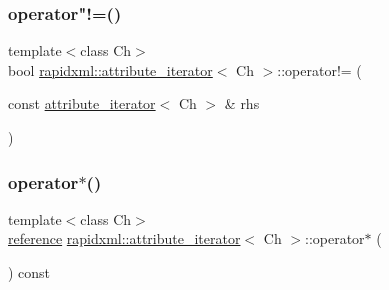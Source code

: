 \subsubsection{\texorpdfstring{operator"!=()}{operator!=()}\hspace{0.1cm}{\footnotesize\ttfamily [2/2]}}
{\footnotesize\ttfamily template$<$class Ch$>$ \\
bool \mbox{\hyperlink{classrapidxml_1_1attribute__iterator}{rapidxml\+::attribute\+\_\+iterator}}$<$ Ch $>$\+::operator!= (\begin{DoxyParamCaption}\item[{const \mbox{\hyperlink{classrapidxml_1_1attribute__iterator}{attribute\+\_\+iterator}}$<$ Ch $>$ \&}]{rhs }\end{DoxyParamCaption})\hspace{0.3cm}{\ttfamily [inline]}}

\mbox{\label{classrapidxml_1_1attribute__iterator_aa15f5f06d2a6199467a33aa19f4357aa}} 
\subsubsection{\texorpdfstring{operator$\ast$()}{operator*()}\hspace{0.1cm}{\footnotesize\ttfamily [1/2]}}
{\footnotesize\ttfamily template$<$class Ch$>$ \\
\mbox{\hyperlink{classrapidxml_1_1attribute__iterator_a097343e44557de14de86b470d3f917d9}{reference}} \mbox{\hyperlink{classrapidxml_1_1attribute__iterator}{rapidxml\+::attribute\+\_\+iterator}}$<$ Ch $>$\+::operator$\ast$ (\begin{DoxyParamCaption}{ }\end{DoxyParamCaption}) const\hspace{0.3cm}{\ttfamily [inline]}}

\mbox{\label{classrapidxml_1_1attribute__iterator_aa15f5f06d2a6199467a33aa19f4357aa}} 
